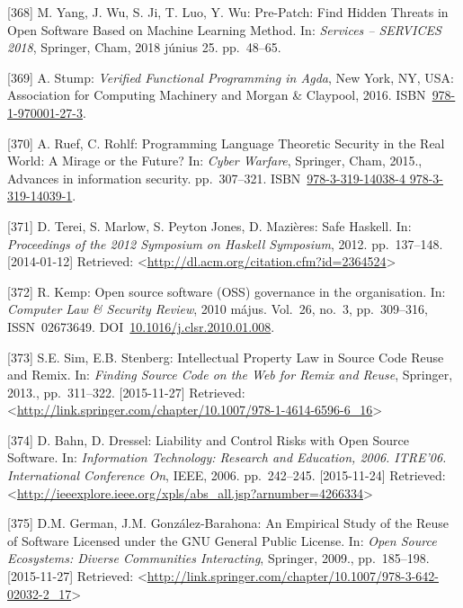 \documentclass[12pt,magyar,a4paper,oneside]{scrreprt}
\begin{document}
\leavevmode\hypertarget{ref-yang_pre-patch_2018}{}%
{[}368{]} M. Yang, J. Wu, S. Ji, T. Luo, Y. Wu: Pre-Patch: Find Hidden
Threats in Open Software Based on Machine Learning Method. In:
\emph{Services -- SERVICES 2018}, Springer, Cham, 2018 június 25.
pp.~48--65.

\leavevmode\hypertarget{ref-stump_verified_2016}{}%
{[}369{]} A. Stump: \emph{Verified Functional Programming in Agda}, New
York, NY, USA: Association for Computing Machinery and Morgan \&
Claypool, 2016.
ISBN~\href{https://worldcat.org/isbn/978-1-970001-27-3}{978-1-970001-27-3}.

\leavevmode\hypertarget{ref-ruef_programming_2015}{}%
{[}370{]} A. Ruef, C. Rohlf: Programming Language Theoretic Security in
the Real World: A Mirage or the Future? In: \emph{Cyber Warfare},
Springer, Cham, 2015., Advances in information security. pp.~307--321.
ISBN~\href{https://worldcat.org/isbn/978-3-319-14038-4\%20978-3-319-14039-1}{978-3-319-14038-4 978-3-319-14039-1}.

\leavevmode\hypertarget{ref-terei_safe_2012}{}%
{[}371{]} D. Terei, S. Marlow, S. Peyton Jones, D. Mazières: Safe
Haskell. In: \emph{Proceedings of the 2012 Symposium on Haskell
Symposium}, 2012. pp.~137--148. {[}2014-01-12{]} Retrieved:
\textless{}\url{http://dl.acm.org/citation.cfm?id=2364524}\textgreater{}

\leavevmode\hypertarget{ref-kemp_open_2010}{}%
{[}372{]} R. Kemp: Open source software (OSS) governance in the
organisation. In: \emph{Computer Law \& Security Review}, 2010 május.
Vol.~26, no.~3, pp.~309--316, ISSN~02673649.
DOI~\href{https://doi.org/10.1016/j.clsr.2010.01.008}{10.1016/j.clsr.2010.01.008}.

\leavevmode\hypertarget{ref-sim_intellectual_2013}{}%
{[}373{]} S.E. Sim, E.B. Stenberg: Intellectual Property Law in Source
Code Reuse and Remix. In: \emph{Finding Source Code on the Web for Remix
and Reuse}, Springer, 2013., pp.~311--322. {[}2015-11-27{]} Retrieved:
\textless{}\url{http://link.springer.com/chapter/10.1007/978-1-4614-6596-6_16}\textgreater{}

\leavevmode\hypertarget{ref-bahn_liability_2006}{}%
{[}374{]} D. Bahn, D. Dressel: Liability and Control Risks with Open
Source Software. In: \emph{Information Technology: Research and
Education, 2006. ITRE'06. International Conference On}, IEEE, 2006.
pp.~242--245. {[}2015-11-24{]} Retrieved:
\textless{}\url{http://ieeexplore.ieee.org/xpls/abs_all.jsp?arnumber=4266334}\textgreater{}

\leavevmode\hypertarget{ref-german_empirical_2009}{}%
{[}375{]} D.M. German, J.M. González-Barahona: An Empirical Study of the
Reuse of Software Licensed under the GNU General Public License. In:
\emph{Open Source Ecosystems: Diverse Communities Interacting},
Springer, 2009., pp.~185--198. {[}2015-11-27{]} Retrieved:
\textless{}\url{http://link.springer.com/chapter/10.1007/978-3-642-02032-2_17}\textgreater{}
\end{document}
